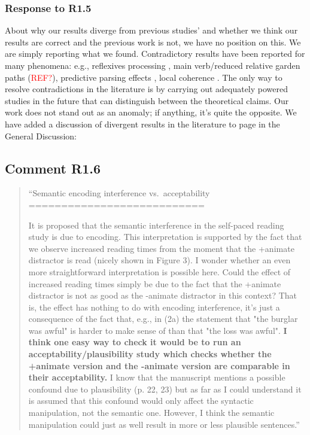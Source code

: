 \documentclass[12pt]{article}
\begin{document}
\subsubsection*{Response to R1.5}
About why our results diverge from previous studies' and whether we think our results are correct and the previous work is not, we have no position on this. We are simply reporting what we found. Contradictory results have been reported for many phenomena: e.g., reflexives processing \citep{jaeger_etal_2020}, main verb/reduced relative garden paths (\textcolor{red}{REF?}), predictive parsing effects \citep{nieuwland_etal_2018}, local coherence \citep{lcpaape2023}. The only way to resolve contradictions in the literature is by carrying out adequately powered studies in the future that can distinguish between the theoretical claims. Our work does not stand out as an anomaly; if anything, it's quite the opposite. We have added a discussion of divergent results in the literature to page \pageref{not_an_anomaly} in the General Discussion:

\begin{quote}
\end{quote}

\subsection*{Comment R1.6}
\begin{quote}
``Semantic encoding interference vs.\ acceptability\\
===========================

It is proposed that the semantic interference in the self-paced reading study is due to encoding. This interpretation is supported by the fact that we observe increased reading times from the moment that the +animate distractor is read (nicely shown in Figure 3). I wonder whether an even more straightforward interpretation is possible here. Could the effect of increased reading times simply be due to the fact that the +animate distractor is not as good as the -animate distractor in this context? That is, the effect has nothing to do with encoding interference, it's just a consequence of the fact that, e.g., in (2a) the statement that "the burglar was awful" is harder to make sense of than that "the loss was awful". \textbf{I think one easy way to check it would be to run an acceptability/plausibility study which checks whether the +animate version and the -animate version are comparable in their acceptability.} I know that the manuscript mentions a possible confound due to plausibility (p. 22, 23) but as far as I could understand it is assumed that this confound would only affect the syntactic manipulation, not the semantic one. However, I think the semantic manipulation could just as well result in more or less plausible sentences.''\end{quote}
\end{document}
